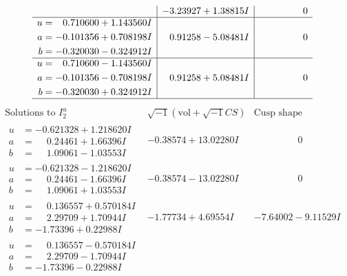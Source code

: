 \documentclass[1p]{elsarticle_modified}
\theoremstyle{definition}
\newcommand{\I}{\sqrt{-1}}
\begin{document}
$$\begin{array}{c|c|c}
 & -3.23927 + 1.38815 I & \phantom{-0.000000 } 0 \\ \hline\begin{aligned}
u &= \phantom{-}0.710600 + 1.143560 I \\
a &= -0.101356 + 0.708198 I \\
b &= -0.320030 - 0.324912 I\end{aligned}
 & \phantom{-}0.91258 - 5.08481 I & \phantom{-0.000000 } 0 \\ \hline\begin{aligned}
u &= \phantom{-}0.710600 - 1.143560 I \\
a &= -0.101356 - 0.708198 I \\
b &= -0.320030 + 0.324912 I\end{aligned}
 & \phantom{-}0.91258 + 5.08481 I & \phantom{-0.000000 } 0\\
 \hline 
 \end{array}$$\newpage$$\begin{array}{c|c|c}  
\text{Solutions to }I^u_{2}& \I (\text{vol} + \sqrt{-1}CS) & \text{Cusp shape}\\
 \hline 
\begin{aligned}
u &= -0.621328 + 1.218620 I \\
a &= \phantom{-}0.24461 + 1.66396 I \\
b &= \phantom{-}1.09061 - 1.03553 I\end{aligned}
 & -0.38574 + 13.02280 I & \phantom{-0.000000 } 0 \\ \hline\begin{aligned}
u &= -0.621328 - 1.218620 I \\
a &= \phantom{-}0.24461 - 1.66396 I \\
b &= \phantom{-}1.09061 + 1.03553 I\end{aligned}
 & -0.38574 - 13.02280 I & \phantom{-0.000000 } 0 \\ \hline\begin{aligned}
u &= \phantom{-}0.136557 + 0.570184 I \\
a &= \phantom{-}2.29709 + 1.70944 I \\
b &= -1.73396 + 0.22988 I\end{aligned}
 & -1.77734 + 4.69554 I & -7.64002 - 9.11529 I \\ \hline\begin{aligned}
u &= \phantom{-}0.136557 - 0.570184 I \\
a &= \phantom{-}2.29709 - 1.70944 I \\
b &= -1.73396 - 0.22988 I\end{aligned}

\end{array}$$
\end{document}
